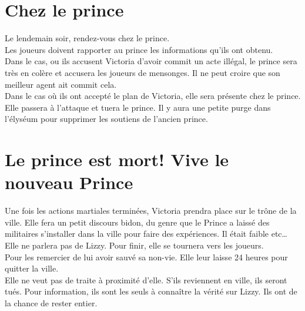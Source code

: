 \documentclass[oneside,12pt]{book}
\begin{document}
\begin{flushleft}
\section{Chez le prince}
Le lendemain soir, rendez-vous chez le prince.\\
Les joueurs doivent rapporter au prince les informations qu'ils ont obtenu.\\
\vspace{0.5cm}
Dans le cas, ou ils accusent Victoria d'avoir commit un acte illégal, le prince sera très en colère et accusera les joueurs de mensonges. Il ne peut croire que son meilleur agent ait commit cela.\\
Dans le cas où ils ont accepté le plan de Victoria, elle sera présente chez le prince. Elle passera à l'attaque et tuera le prince. Il y aura une petite purge dans l'élyséum pour supprimer les soutiens de l'ancien prince.\\

\section{Le prince est mort! Vive le nouveau Prince}
Une fois les actions martiales terminées, Victoria prendra place sur le trône de la ville. 
Elle fera un petit discours bidon, du genre que le Prince a laissé des militaires s'installer dans la ville pour faire des expériences. Il était faible etc…
Elle ne parlera pas de Lizzy. Pour finir, elle se tournera vers les joueurs. \\
Pour les remercier de lui avoir sauvé sa non-vie. Elle leur laisse 24 heures pour quitter la ville.\\
Elle ne veut pas de traite à proximité d'elle. S'ils reviennent en ville, ils seront tués.
Pour information, ils sont les seuls à connaître la vérité sur Lizzy. Ils ont de la chance de rester entier.\\


\end{flushleft}
\end{document}
